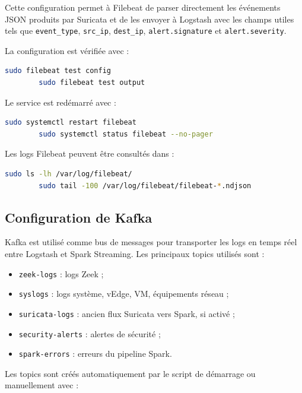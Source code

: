 \documentclass[12pt,a4paper,oneside]{report}
\begin{document}
    Cette configuration permet à Filebeat de parser directement les événements JSON produits par Suricata et de les envoyer à Logstash avec les champs utiles tels que \texttt{event\_type}, \texttt{src\_ip}, \texttt{dest\_ip}, \texttt{alert.signature} et \texttt{alert.severity}.
    
    La configuration est vérifiée avec :
    
    \begin{lstlisting}[language=bash]
    	sudo filebeat test config
    	sudo filebeat test output
    \end{lstlisting}
    
    Le service est redémarré avec :
    
    \begin{lstlisting}[language=bash]
    	sudo systemctl restart filebeat
    	sudo systemctl status filebeat --no-pager
    \end{lstlisting}
    
    Les logs Filebeat peuvent être consultés dans :
    
    \begin{lstlisting}[language=bash]
    	sudo ls -lh /var/log/filebeat/
    	sudo tail -100 /var/log/filebeat/filebeat-*.ndjson
    \end{lstlisting}
    
    \subsection{Configuration de Kafka}
    
    Kafka est utilisé comme bus de messages pour transporter les logs en temps réel entre Logstash et Spark Streaming. Les principaux topics utilisés sont :
    
    \begin{itemize}
    	\item \texttt{zeek-logs} : logs Zeek ;
    	\item \texttt{syslogs} : logs système, vEdge, VM, équipements réseau ;
    	\item \texttt{suricata-logs} : ancien flux Suricata vers Spark, si activé ;
    	\item \texttt{security-alerts} : alertes de sécurité ;
    	\item \texttt{spark-errors} : erreurs du pipeline Spark.
    \end{itemize}
    
    Les topics sont créés automatiquement par le script de démarrage ou manuellement avec :
    
\end{document}
